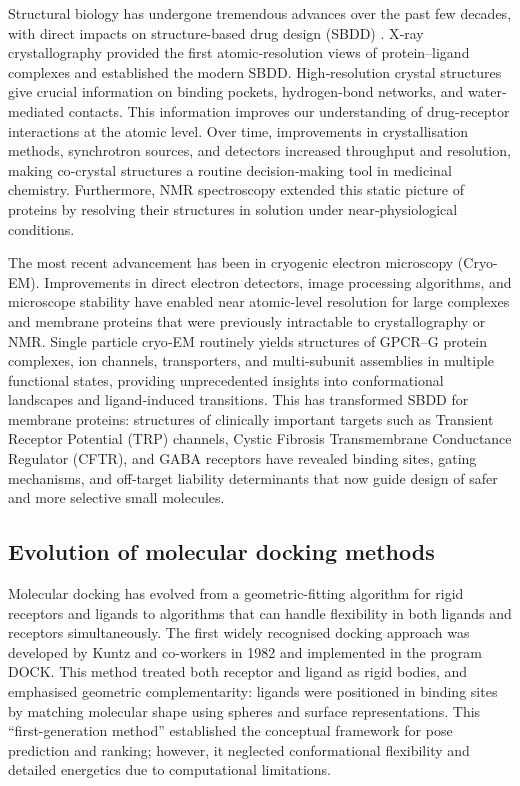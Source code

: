 \documentclass[12pt]{article}
\begin{document}
Structural biology has undergone tremendous advances over the past few decades, with direct impacts on structure-based drug design (SBDD) \cite{CH1_4}.  X‑ray crystallography provided the first atomic‑resolution views of protein–ligand complexes and established the modern SBDD. High‑resolution crystal structures give crucial information on binding pockets, hydrogen‑bond networks, and water-mediated contacts. This information improves our understanding of drug-receptor interactions at the atomic level. Over time, improvements in crystallisation methods, synchrotron sources, and detectors increased throughput and resolution, making co‑crystal structures a routine decision‑making tool in medicinal chemistry. Furthermore, NMR spectroscopy extended this static picture of proteins by resolving their structures in solution under near‑physiological conditions\cite{CH1_4}. 

The most recent advancement has been in cryogenic electron microscopy (Cryo-EM). Improvements in direct electron detectors, image processing algorithms, and microscope stability have enabled near atomic-level resolution for large complexes and membrane proteins that were previously intractable to crystallography or NMR. Single particle cryo‑EM routinely yields structures of GPCR–G protein complexes, ion channels, transporters, and multi‑subunit assemblies in multiple functional states, providing unprecedented insights into conformational landscapes and ligand‑induced transitions. This has transformed SBDD for membrane proteins: structures of clinically important targets such as Transient Receptor Potential (TRP) channels,  Cystic Fibrosis Transmembrane Conductance Regulator (CFTR), and GABA receptors have revealed binding sites, gating mechanisms, and off‑target liability determinants that now guide design of safer and more selective small molecules\cite{CH1_5}.



\subsection{Evolution of molecular docking methods}

Molecular docking has evolved from a geometric-fitting algorithm for rigid receptors and ligands to algorithms that can handle flexibility in both ligands and receptors simultaneously. The first widely recognised docking approach was developed by Kuntz and co-workers in 1982 and implemented in the program DOCK.\cite{CH1_6} This method treated both receptor and ligand as rigid bodies, and emphasised geometric complementarity: ligands were positioned in binding sites by matching molecular shape using spheres and surface representations. This “first-generation method” established the conceptual framework for pose prediction and ranking; however, it neglected conformational flexibility and detailed energetics due to computational limitations.
\end{document}
